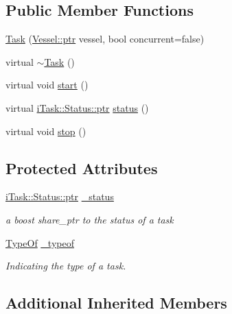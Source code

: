 \subsection*{Public Member Functions}
\begin{DoxyCompactItemize}
\item 
\hyperlink{classo_cpt_1_1_task_a814069aa4c458d09807eb78937702521}{Task} (\hyperlink{classo_cpt_1_1i_vessel_a43711a596f3bdfd0ca732ed3901edc97}{Vessel\+::ptr} vessel, bool concurrent=false)
\item 
virtual \hyperlink{classo_cpt_1_1_task_a95accf06842f78630e44190c15d6fca4}{$\sim$\+Task} ()
\item 
virtual void \hyperlink{classo_cpt_1_1_task_a8acd8d2125df0aef37eb1ebf0e3e49c8}{start} ()
\item 
virtual \hyperlink{classo_cpt_1_1i_task_1_1_status_aaf766c58d038e2defc3de2dddb92d1eb}{i\+Task\+::\+Status\+::ptr} \hyperlink{classo_cpt_1_1_task_a724445e158919a4b5644d8eef9f7c754}{status} ()
\item 
virtual void \hyperlink{classo_cpt_1_1_task_a62b4f1bbc1cf24434d2a2130162507f7}{stop} ()
\end{DoxyCompactItemize}
\subsection*{Protected Attributes}
\begin{DoxyCompactItemize}
\item 
\hyperlink{classo_cpt_1_1i_task_1_1_status_aaf766c58d038e2defc3de2dddb92d1eb}{i\+Task\+::\+Status\+::ptr} \hyperlink{classo_cpt_1_1_task_a51a0e1718a13e6d59af76511e6473743}{\+\_\+status}
\begin{DoxyCompactList}\small\item\em a boost share\+\_\+ptr to the status of a task \end{DoxyCompactList}\item 
\hyperlink{classo_cpt_1_1i_task_a10d8726eb8957c2c305f468cf15b9f11}{Type\+Of} \hyperlink{classo_cpt_1_1_task_ac4073446fdd30a1f2296da6b6fcaf802}{\+\_\+typeof}
\begin{DoxyCompactList}\small\item\em Indicating the type of a task. \end{DoxyCompactList}\end{DoxyCompactItemize}
\subsection*{Additional Inherited Members}


